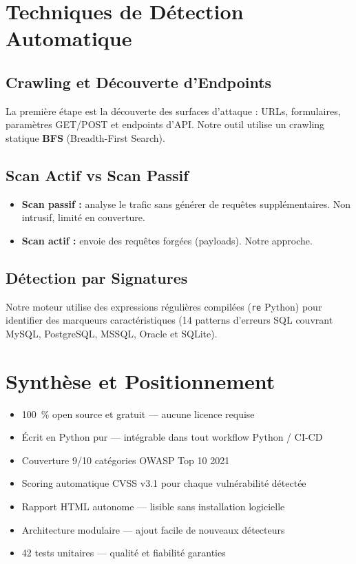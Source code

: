 \documentclass[12pt,a4paper]{report}
\newcommand{\code}[1]{\texttt{#1}}
\begin{document}
\section{Techniques de Détection Automatique}

\subsection{Crawling et Découverte d'Endpoints}
La première étape est la découverte des surfaces d'attaque : URLs, formulaires, paramètres
GET/POST et endpoints d'API. Notre outil utilise un crawling statique \textbf{BFS}
(Breadth-First Search).

\subsection{Scan Actif vs Scan Passif}
\begin{itemize}
  \item \textbf{Scan passif :} analyse le trafic sans générer de requêtes supplémentaires.
    Non intrusif, limité en couverture.
  \item \textbf{Scan actif :} envoie des requêtes forgées (payloads). Notre approche.
\end{itemize}

\subsection{Détection par Signatures}
Notre moteur utilise des expressions régulières compilées (\code{re} Python) pour identifier
des marqueurs caractéristiques (14 patterns d'erreurs SQL couvrant MySQL, PostgreSQL, MSSQL,
Oracle et SQLite).

\section{Synthèse et Positionnement}

\begin{infobox}[title={Positionnement de notre scanner OWASP Top 10}]
\begin{itemize}[nosep]
  \item 100~\% open source et gratuit — aucune licence requise
  \item Écrit en Python pur — intégrable dans tout workflow Python / CI-CD
  \item Couverture 9/10 catégories OWASP Top 10 2021
  \item Scoring automatique CVSS v3.1 pour chaque vulnérabilité détectée
  \item Rapport HTML autonome — lisible sans installation logicielle
  \item Architecture modulaire — ajout facile de nouveaux détecteurs
  \item 42 tests unitaires — qualité et fiabilité garanties
\end{itemize}
\end{infobox}
\end{document}
